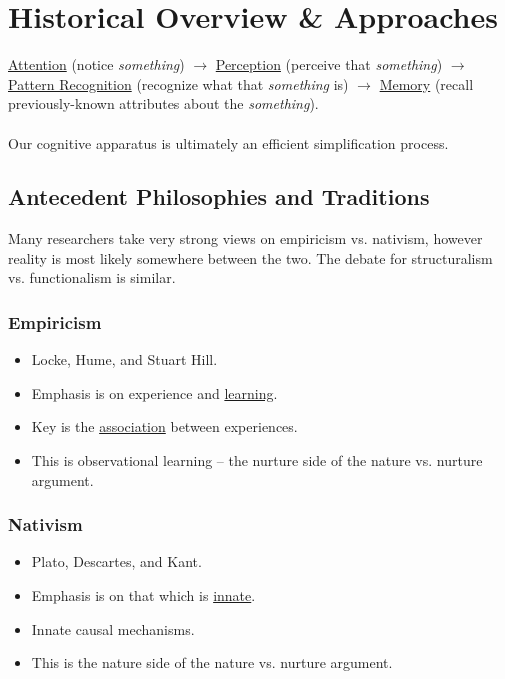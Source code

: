 \documentclass[]{article}
\newcommand{\lecture}[1]{\marginpar{{\footnotesize $\leftarrow$ \underline{#1}}}}
\begin{document}
	\section{Historical Overview \& Approaches} \lecture{January 10, 2013}
		\underline{Attention} (notice \emph{something}) $\to$ \underline{Perception} (perceive that \emph{something}) $\to$ \underline{Pattern Recognition} (recognize what that \emph{something} is) $\to$ \underline{Memory} (recall previously-known attributes about the \emph{something}).
		\\ \\
		Our cognitive apparatus is ultimately an efficient simplification process.

		\subsection{Antecedent Philosophies and Traditions}
			Many researchers take very strong views on empiricism vs. nativism, however reality is most likely somewhere between the two. The debate for structuralism vs. functionalism is similar.

			\subsubsection{Empiricism}
				\begin{itemize}
					\item Locke, Hume, and Stuart Hill.
					\item Emphasis is on experience and \underline{learning}.
					\item Key is the \underline{association} between experiences.
					\item This is observational learning -- the nurture side of the nature vs. nurture argument.
				\end{itemize}

			\subsubsection{Nativism}
				\begin{itemize}
					\item Plato, Descartes, and Kant.
					\item Emphasis is on that which is \underline{innate}.
					\item Innate causal mechanisms.
					\item This is the nature side of the nature vs. nurture argument.
				\end{itemize}
\end{document}
